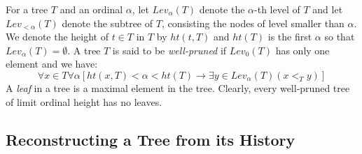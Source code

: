 \documentclass[11pt]{amsart}
\theoremstyle{plain}
\theoremstyle{definition} %
\theoremstyle{remark}
\begin{document}
For a tree $T$ and an ordinal $\alpha$, let $Lev_\alpha(T)$ denote the $\alpha$-th level of $T$ and let $Lev_{<\alpha}(T)$ denote the subtree of $T$, consisting the nodes of level smaller than $\alpha$. We denote the height of $t \in T$ in $T$ by $ht(t,T)$ and $ht(T)$ is the first $\alpha$ so that $Lev_\alpha(T)=\emptyset$. A tree $T$ is said to be \emph{well-pruned} if $Lev_0(T)$ has only one element and we have:
\[
\forall x \in T \forall \alpha [ht(x,T)<\alpha<ht(T) \rightarrow \exists y \in Lev_\alpha(T)(x<_T y)]
\]
A \emph{leaf} in a tree is a maximal element in the tree. Clearly, every well-pruned tree of limit ordinal height has no leaves.




\subsection{Reconstructing a Tree from its History}
\end{document}
